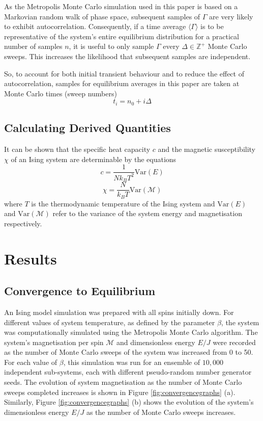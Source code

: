 \documentclass[11pt]{iopart}
\begin{document}
As the Metropolis Monte Carlo simulation used in this paper is based on a Markovian random walk of phase space, subsequent samples of $\Gamma$ are very likely to exhibit autocorrelation. Consequently, if a time average $\langle \Gamma \rangle$ is to be representative of the system's entire equilibrium distribution for a practical number of samples $n$, it is useful to only sample $\Gamma$ every $\Delta \in \mathbb{Z}^{+}$ Monte Carlo sweeps. This increases the likelihood that subsequent samples are independent.

So, to account for both initial transient behaviour and to reduce the effect of autocorrelation, samples for equilibrium averages in this paper are taken at Monte Carlo times (sweep numbers)
\begin{equation}
\label{eq:samples}
t_i = n_0 + i \Delta
\end{equation}  

\subsection{Calculating Derived Quantities}

It can be shown that the specific heat capacity $c$ and the magnetic susceptibility $\chi$ of an Ising system are determinable by the equations \cite{handout}
\begin{equation}
c = \frac{1}{N k_B T^2} \textrm{Var}(E)
\end{equation}
\begin{equation}
\chi = \frac{N}{k_B T} \textrm{Var}({\mathcal{M}})
\end{equation}
where $T$ is the thermodynamic temperature of the Ising system and $\textrm{Var}(E)$ and $\textrm{Var}(\mathcal{M})$ refer to the variance of the system energy and magnetisation respectively.

\section{Results}

\subsection{Convergence to Equilibrium}

An Ising model simulation was prepared with all spins initially down. For different values of system temperature, as defined by the parameter $\beta$, the system was computationally simulated using the Metropolis Monte Carlo algorithm. The system's magnetisation per spin $\mathcal{M}$ and dimensionless energy $E/J$ were recorded as the number of Monte Carlo sweeps of the system was increased from 0 to 50. For each value of $\beta$, this simulation was run for an ensemble of $10,000$ independent sub-systems, each with different pseudo-random number generator seeds. The evolution of system magnetisation as the number of Monte Carlo sweeps completed increases is shown in Figure \ref{fig:convergencegraphs} (a). Similarly, Figure \ref{fig:convergencegraphs} (b) shows the evolution of the system's dimensionless energy $E/J$ as the number of Monte Carlo sweeps increases.
\end{document}

